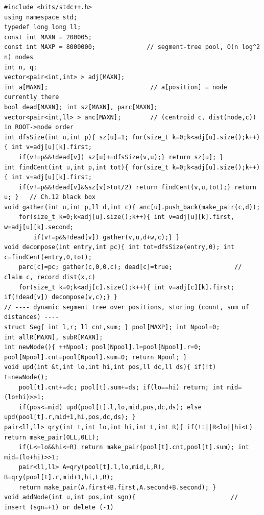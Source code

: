 \begin{lstlisting}[caption={CF 757G Summit: centroid decomposition; per centroid, two dynamic segment trees over POSITIONS -- all[c] stores dist(node,c) and sub[c] stores dist(node,parc[c]). A query for v walks v's centroid ancestors combining all minus the child's sub; a swap deletes and re-inserts two nodes' O(log n) entries. XOR-decode against the last answer. ASCII only}, label={lst:c18-summit}]
#include <bits/stdc++.h>
using namespace std;
typedef long long ll;
const int MAXN = 200005;
const int MAXP = 8000000;              // segment-tree pool, O(n log^2 n) nodes
int n, q;
vector<pair<int,int> > adj[MAXN];
int a[MAXN];                            // a[position] = node currently there
bool dead[MAXN]; int sz[MAXN], parc[MAXN];
vector<pair<int,ll> > anc[MAXN];        // (centroid c, dist(node,c)) in ROOT->node order
int dfsSize(int u,int p){ sz[u]=1; for(size_t k=0;k<adj[u].size();k++){ int v=adj[u][k].first;
    if(v!=p&&!dead[v]) sz[u]+=dfsSize(v,u);} return sz[u]; }
int findCent(int u,int p,int tot){ for(size_t k=0;k<adj[u].size();k++){ int v=adj[u][k].first;
    if(v!=p&&!dead[v]&&sz[v]>tot/2) return findCent(v,u,tot);} return u; }   // Ch.12 black box
void gather(int u,int p,ll d,int c){ anc[u].push_back(make_pair(c,d));
    for(size_t k=0;k<adj[u].size();k++){ int v=adj[u][k].first, w=adj[u][k].second;
        if(v!=p&&!dead[v]) gather(v,u,d+w,c);} }
void decompose(int entry,int pc){ int tot=dfsSize(entry,0); int c=findCent(entry,0,tot);
    parc[c]=pc; gather(c,0,0,c); dead[c]=true;                 // claim c, record dist(x,c)
    for(size_t k=0;k<adj[c].size();k++){ int v=adj[c][k].first; if(!dead[v]) decompose(v,c);} }
// ---- dynamic segment tree over positions, storing (count, sum of distances) ----
struct Seg{ int l,r; ll cnt,sum; } pool[MAXP]; int Npool=0;
int allR[MAXN], subR[MAXN];
int newNode(){ ++Npool; pool[Npool].l=pool[Npool].r=0; pool[Npool].cnt=pool[Npool].sum=0; return Npool; }
void upd(int &t,int lo,int hi,int pos,ll dc,ll ds){ if(!t) t=newNode();
    pool[t].cnt+=dc; pool[t].sum+=ds; if(lo==hi) return; int mid=(lo+hi)>>1;
    if(pos<=mid) upd(pool[t].l,lo,mid,pos,dc,ds); else upd(pool[t].r,mid+1,hi,pos,dc,ds); }
pair<ll,ll> qry(int t,int lo,int hi,int L,int R){ if(!t||R<lo||hi<L) return make_pair(0LL,0LL);
    if(L<=lo&&hi<=R) return make_pair(pool[t].cnt,pool[t].sum); int mid=(lo+hi)>>1;
    pair<ll,ll> A=qry(pool[t].l,lo,mid,L,R), B=qry(pool[t].r,mid+1,hi,L,R);
    return make_pair(A.first+B.first,A.second+B.second); }
void addNode(int u,int pos,int sgn){                          // insert (sgn=+1) or delete (-1)

\end{lstlisting}
